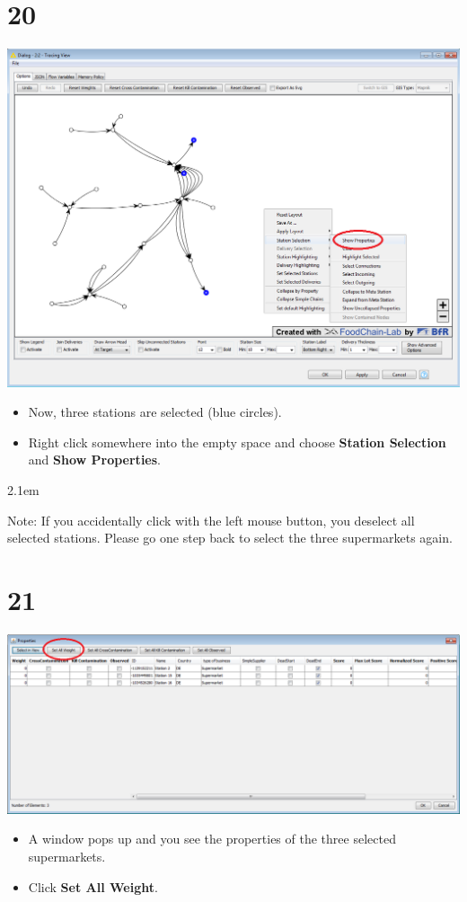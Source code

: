 \documentclass[10pt]{beamer}
\begin{document}
\section{20}
\begin{frame}
	\begin{center}
  		\includegraphics[height=0.6\textheight]{20.png}
	\end{center}
	\begin{itemize}
		\item Now, three stations are selected (blue circles).
		\item Right click somewhere into the empty space and choose \textbf{Station Selection} and \textbf{Show Properties}.
	\end{itemize}
\leftskip2.1em{\small Note: If you accidentally click with the left mouse button, you deselect all selected stations. Please go one step back to select the three supermarkets again.\par}
\end{frame}

\section{21}
\begin{frame}
	\begin{center}
  		\includegraphics[width=0.9\columnwidth]{21.png}
	\end{center}
	\begin{itemize}
		\item A window pops up and you see the properties of the three selected supermarkets.
		\item Click \textbf{Set All Weight}.
	\end{itemize}
\end{frame}
\end{document}
